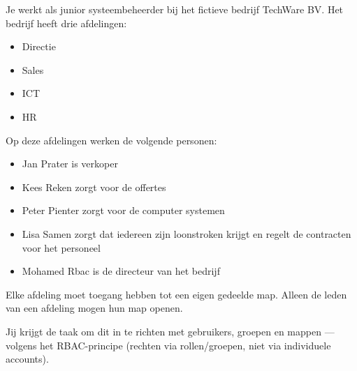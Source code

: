 Je werkt als junior systeembeheerder bij het fictieve bedrijf TechWare BV. Het bedrijf heeft drie afdelingen:
\begin{itemize}
\item Directie
\item Sales
\item ICT
\item HR
\end{itemize}
Op deze afdelingen werken de volgende personen:
\begin{itemize}
\item Jan Prater is verkoper
\item Kees Reken zorgt voor de offertes
\item Peter Pienter zorgt voor de computer systemen
\item Lisa Samen zorgt dat iedereen zijn loonstroken krijgt en regelt de contracten voor het personeel
\item Mohamed Rbac is de directeur van het bedrijf
\end{itemize}

Elke afdeling moet toegang hebben tot een eigen gedeelde map. Alleen de leden van een afdeling mogen hun map openen.

Jij krijgt de taak om dit in te richten met gebruikers, groepen en mappen — volgens het RBAC-principe (rechten via rollen/groepen, niet via individuele accounts).


